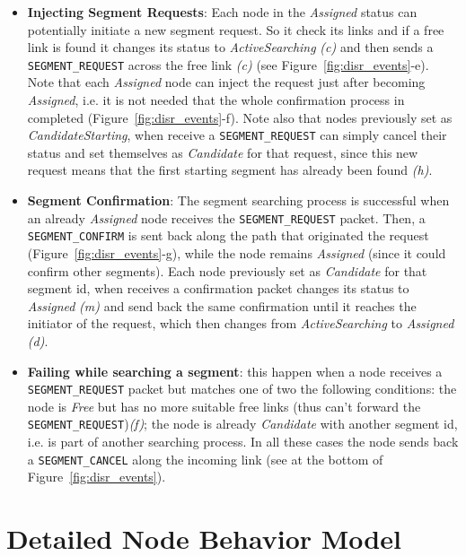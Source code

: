 \begin{itemize}
\item{\textbf{Injecting Segment Requests}}: Each node in the
\emph{Assigned} status can potentially initiate a new segment request.
So it check its links and if a free link is found it changes its
status to \emph{ActiveSearching} \emph{(c)} and then sends
a \texttt{SEGMENT\_REQUEST} across the free link \emph{(c)} (see
Figure~\ref{fig:disr_events}-e). 
Note that each \emph{Assigned} node can inject the request just after
becoming \emph{Assigned}, i.e. it is not needed that the whole confirmation
process in completed (Figure~\ref{fig:disr_events}-f).
Note also that nodes previously set as \emph{CandidateStarting}, when receive
a \texttt{SEGMENT\_REQUEST} can simply cancel their
status and set themselves as \emph{Candidate} for that request, since this new
request means that the first starting segment has already been found \emph{(h)}. 

\item{\textbf{Segment Confirmation}}: The segment searching process is
successful when an already \emph{Assigned} node receives the
\texttt{SEGMENT\_REQUEST} packet. Then, a \texttt{SEGMENT\_CONFIRM} is
sent back along the path that originated the request
(Figure~\ref{fig:disr_events}-g), while the node remains
\emph{Assigned} (since it could confirm other segments). Each node
previously set as \emph{Candidate} for that segment id, when receives
a confirmation packet changes its status to \emph{Assigned} \emph{(m)}
and send back the same confirmation until it reaches the initiator of
the request, which then changes from \emph{ActiveSearching} to
\emph{Assigned} \emph{(d)}.

\item{\textbf{Failing while searching a segment}}: this happen when a node receives a \texttt{SEGMENT\_REQUEST} packet but
matches one of two the following conditions: the node is \emph{Free} but has no
more suitable free links (thus can’t forward the
\texttt{SEGMENT\_REQUEST})\emph{(f)}; the node
is already \emph{Candidate} with another segment id, i.e. is part of another searching process. In all these cases the node
sends back a \texttt{SEGMENT\_CANCEL} along the incoming link (see at
the bottom of Figure~\ref{fig:disr_events}).
\end{itemize}


\section{Detailed Node Behavior Model}
\label{sec:execution_model}

